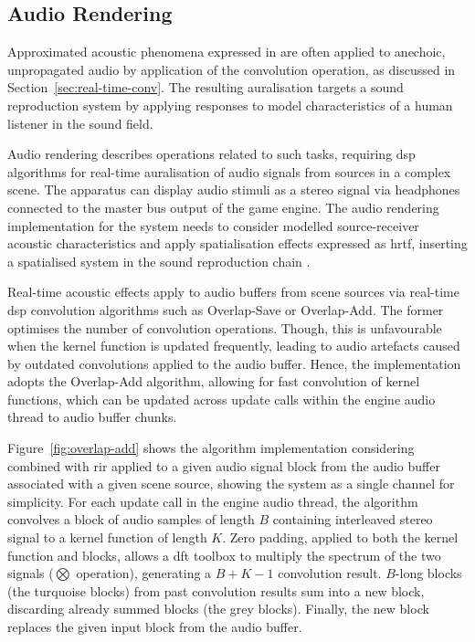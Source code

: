 \subsection{Audio Rendering}
Approximated acoustic phenomena expressed in  are often applied to anechoic, unpropagated audio by application of the convolution operation, as discussed in Section~\ref{sec:real-time-conv}. The resulting auralisation targets a sound reproduction system by applying responses to model characteristics of a human listener in the sound field.\par
Audio rendering describes operations related to such tasks, requiring \acrshort{dsp} algorithms for real-time auralisation of audio signals from sources in a complex scene. The apparatus can display audio stimuli as a stereo signal via headphones connected to the master bus output of the game engine. The audio rendering implementation for the system needs to consider modelled source-receiver acoustic characteristics and apply spatialisation effects expressed as \acrshort{hrtf}, inserting a spatialised system in the sound reproduction chain \citep{liu2022sound}.\par
Real-time acoustic effects apply to audio buffers from scene sources via real-time \acrshort{dsp} convolution algorithms such as Overlap-Save or Overlap-Add. The former optimises the number of convolution operations. Though, this is unfavourable when the kernel function is updated frequently, leading to audio artefacts caused by outdated convolutions applied to the audio buffer. Hence, the implementation adopts the Overlap-Add algorithm, allowing for fast convolution of kernel functions, which can be updated across update calls within the engine audio thread to audio buffer chunks.\par
Figure~\ref{fig:overlap-add} shows the algorithm implementation considering  combined with \acrshort{rir} applied to a given audio signal block from the audio buffer associated with a given scene source, showing the system as a single channel for simplicity. For each update call in the engine audio thread, the algorithm convolves a block of audio samples of length $B$ containing interleaved stereo signal to a kernel function of length $K$. Zero padding, applied to both the kernel function and blocks, allows a \acrshort{dft} toolbox to multiply the spectrum of the two signals ($\bigotimes$ operation), generating a $B+K-1$ convolution result. $B$-long blocks (the turquoise blocks) from past convolution results sum into a new block, discarding already summed blocks (the grey blocks). Finally, the new block replaces the given input block from the audio buffer.\par


